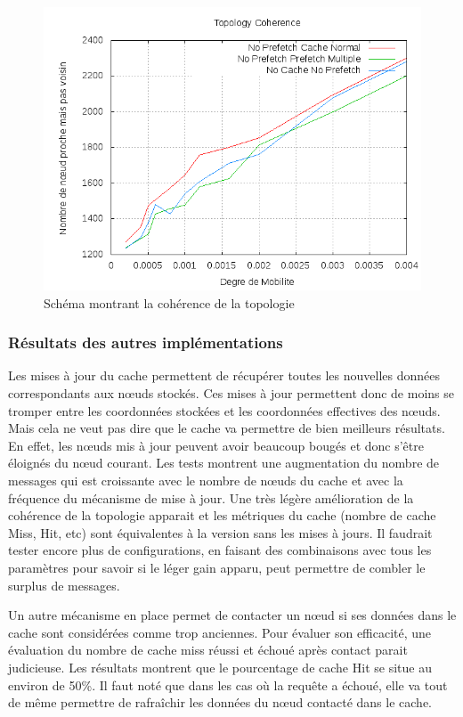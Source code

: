 	\begin{figure}[!h]
        \centering
        \includegraphics[scale=0.5]{../CacheCode/SolipsisPeersim/resultats/Courbes/Courbes_Final_Rapport/Topology_Coherence_Caches.png}
        \caption{Schéma montrant la cohérence de la topologie}
        \label{courbesTopoCohCache:config1}
        \end{figure}

\subsubsection{Résultats des autres implémentations}

Les mises à jour du cache permettent de récupérer toutes les nouvelles données correspondants aux nœuds stockés. Ces mises à jour permettent donc de moins se tromper entre les coordonnées stockées et les coordonnées effectives des nœuds. Mais cela ne veut pas dire que le cache va permettre de bien meilleurs résultats. En effet, les nœuds mis à jour peuvent avoir beaucoup bougés et donc s'être éloignés du nœud courant. Les tests montrent une augmentation du nombre de messages qui est croissante avec le nombre de nœuds du cache et avec la fréquence du mécanisme de mise à jour. Une très légère amélioration de la cohérence de la topologie apparait et les métriques du cache (nombre de cache Miss, Hit, etc) sont équivalentes à la version sans les mises à jours. Il faudrait tester encore plus de configurations, en faisant des combinaisons avec tous les paramètres pour savoir si le léger gain apparu, peut permettre de combler le surplus de messages.
\par Un autre mécanisme en place permet de contacter un nœud si ses données dans le cache sont considérées comme trop anciennes. Pour évaluer son efficacité, une évaluation du nombre de cache miss réussi et échoué après contact parait judicieuse. Les résultats montrent que le pourcentage de cache Hit se situe au environ de 50\%. Il faut noté que dans les cas où la requête a échoué, elle va tout de même permettre de rafraîchir les données du nœud contacté dans le cache.


